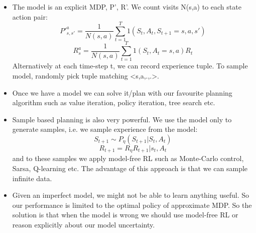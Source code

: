 \documentclass[a4paper]{article}
\begin{document}
\begin{itemize}
        \item The model is an explicit MDP, P', R'. We count visits N(s,a) to each state action pair:
        $$ P'_{s,s'}^a = \frac{1}{N(s,a)} \sum_{t=1}^T 1(S_t,A_t,S_{t+1} = s,a,s')$$
        $$R_s^a = \frac{1}{N(s,a)} \sum_{t=1}^T 1(S_t,A_t= s,a)R_t$$
        \newline
        Alternatively at each time-step t, we can record experience tuple. To sample model, randomly pick tuple matching <s,a,.,.>.
        \item Once we have a model we can solve it/plan with our favourite planning algorithm such as value iteration, policy iteration, tree search etc. 
        \item Sample based planning is also very powerful. We use the model only to generate samples, i.e. we sample experience from the model:
        $$S_{t+1} \sim P_{\eta}(S_{t+1}| S_t, A_t)$$
        $$R_{t+1} = R_{\eta}R_{t+1} | s_t, A_t$$
        and to these samples we apply model-free RL such as Monte-Carlo control, Sarsa, Q-learning etc. The advantage of this approach is that we can sample infinite data. 
        \item Given an imperfect model, we might not be able to learn anything useful. So our performance is limited to the optimal policy of approximate MDP. So the solution is that when the model is wrong we should use model-free RL or reason explicitly about our model uncertainty. 
    \end{itemize}
\end{document}
